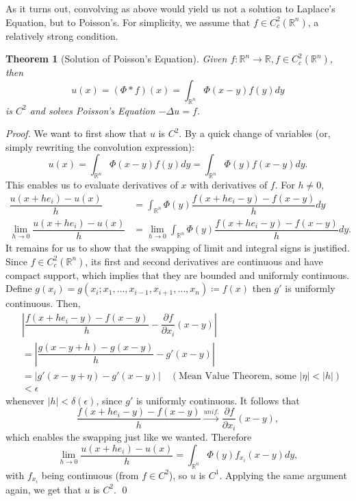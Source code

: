 \documentclass[openany, amssymb, psamsfonts]{amsart}
\newtheorem{thm}{Theorem}[section]
\theoremstyle{definition}
\numberwithin{equation}{section}
\newcommand{\bbr}{\mathbb{R}}
\begin{document}
As it turns out, convolving as above would yield us not a solution to Laplace's Equation, but to Poisson's. For simplicity, we assume that $f \in C^2_c(\bbr^n)$, a relatively strong condition.
\begin{thm} [Solution of Poisson's Equation]
    Given $f: \bbr^n \to \bbr, f \in C^2_c(\bbr^n)$, then
    \begin{equation} \label{poisson_sln}
        u(x) = (\Phi * f)(x) = \int_{\bbr^n} \Phi(x -y) f(y) dy
    \end{equation}
    is $C^2$ and solves Poisson's Equation $-\Delta u = f$.
\end{thm}
\begin{proof}
    We want to first show that $u$ is $C^2$. By a quick change of variables (or, simply rewriting the convolution expression): \begin{equation*}
        u(x) = \int_{\bbr^n} \Phi(x -y) f(y) dy = \int_{\bbr^n} \Phi(y) f(x-y) dy.
    \end{equation*}
    This enables us to evaluate derivatives of $x$ with derivatives of $f$. For $h \neq 0$, \begin{align*}
        \dfrac{u(x + he_i) - u(x)}{h} &= \int_{\bbr^n} \Phi (y) \dfrac{f(x + he_i  -y) - f(x -y)}{h} dy \\
        \lim_{h \to 0} \dfrac{u(x + he_i) - u(x)}{h} &= \lim_{h \to 0} \int_{\bbr^n} \Phi (y) \dfrac{f(x + he_i  -y) - f(x -y)}{h} dy
        .
    \end{align*}
    It remains for us to show that the swapping of limit and integral signs is justified. Since $f \in C^2_c(\bbr^n)$, its first and second derivatives are continuous and have compact support, which implies that they are bounded and uniformly continuous. Define $g (x_i) = g(x_i; x_1, \dots, x_{i-1},x_{i+1}, \dots, x_n) \coloneqq f(x)$ then $g'$ is uniformly continuous. Then,
    \begin{align*}
        &\left| \dfrac{f( x + he_i - y) - f(x -y)} {h} - \dfrac{\partial f}{\partial x_i} (x -y) \right|\\
        &= \left| \dfrac{g(x-y+h) - g(x-y)} {h} - g'(x-y) \right| \\
        &= \left| g'(x-y+\eta) - g'(x-y) \right| \quad (\text{Mean Value Theorem, some } |\eta| < |h|) \\
        &< \epsilon
    \end{align*}
    whenever $|h| < \delta(\epsilon)$, since $g'$ is uniformly continuous. It follows that
    \[
    \dfrac{f( x + he_i - y) - f(x -y)} {h} \xrightarrow{unif.} \dfrac{\partial f}{\partial x_i} (x -y) ,
    \]
    which enables the swapping just like we wanted. Therefore
    \begin{equation*}
        \lim_{h \to 0} \dfrac{u(x + he_i) - u(x)}{h} = \int_{\bbr^n} \Phi (y) f_{x_i}(x - y) dy,
    \end{equation*}
    with $f_{x_i}$ being continuous (from $f \in C^2$), so $u$ is $C^1$. Applying the same argument again, we get that $u$ is $C^2$. \qed


\end{proof}
\end{document}
